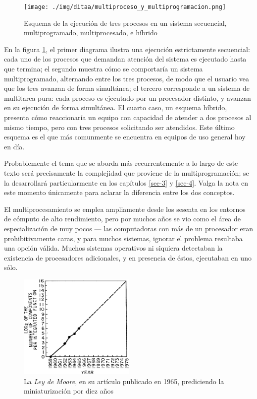 \documentclass[11pt,fleqn]{book} %
\begin{document}
\begin{figure}[htb]
\centering
\texttt{[image: ./img/ditaa/multiproceso\_y\_multiprogramacion.png]}
\caption{\label{HW_multiproceso_y_multiprogramacion}Esquema de la ejecución de tres procesos en un sistema secuencial, multiprogramado, multiprocesado, e híbrido}
\end{figure}

En la figura \ref{HW_multiproceso_y_multiprogramacion}, el primer diagrama ilustra una ejecución
estrictamente secuencial: cada uno de los procesos que demandan
atención del sistema es ejecutado hasta que termina; el segundo
muestra cómo se comportaría un sistema multiprogramado, alternando
entre los tres procesos, de modo que el usuario vea que los tres
avanzan de forma simultánea; el tercero corresponde a un sistema de
multitarea pura: cada proceso es ejecutado por un procesador
distinto, y avanzan en su ejecución de forma simultánea. El cuarto
caso, un esquema híbrido, presenta cómo reaccionaría un equipo con
capacidad de atender a dos procesos al mismo tiempo, pero con tres
procesos solicitando ser atendidos. Este último esquema es el que más
comunmente se encuentra en equipos de uso general hoy en día.

Probablemente el tema que se aborda más recurrentemente a lo largo de este texto
será precisamente la complejidad que proviene de la multiprogramación;
se la desarrollará particularmente en los capítulos \ref{sec-3} y
\ref{sec-4}. Valga la nota en este momento únicamente para aclarar la 
diferencia entre los dos conceptos.

El multiprocesamiento se emplea ampliamente desde los sesenta en los
entornos de cómputo de alto rendimiento, pero por muchos años se vio
como el área de especialización de muy pocos — las computadoras con
más de un procesador eran prohibitivamente caras, y para muchos
sistemas, ignorar el problema resultaba una opción válida. Muchos
sistemas operativos ni siquiera detectaban la existencia de
procesadores adicionales, y en presencia de éstos, ejecutaban en uno
sólo.

\begin{figure}[htb]
\centering
\includegraphics[width=0.5\textwidth]{./img/moore_orig.png}
\caption{\label{HW_moore_orig}La \emph{Ley de Moore}, en su artículo publicado en 1965, prediciendo la miniaturización por diez años}
\end{figure}
\end{document}
